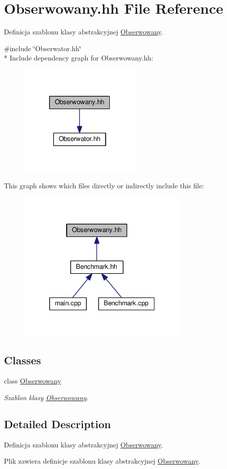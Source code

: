 \hypertarget{a00047}{}\section{Obserwowany.\+hh File Reference}
\label{a00047}


Definicja szablonu klasy abstrakcyjnej \hyperlink{a00015}{Obserwowany}.  


{\ttfamily \#include \char`\"{}Obserwator.\+hh\char`\"{}}\\*
Include dependency graph for Obserwowany.\+hh\+:
\nopagebreak
\begin{figure}[H]
\begin{center}
\leavevmode
\includegraphics[width=172pt]{a00095}
\end{center}
\end{figure}
This graph shows which files directly or indirectly include this file\+:
\nopagebreak
\begin{figure}[H]
\begin{center}
\leavevmode
\includegraphics[width=239pt]{a00096}
\end{center}
\end{figure}
\subsection*{Classes}
\begin{DoxyCompactItemize}
\item 
class \hyperlink{a00015}{Obserwowany}
\begin{DoxyCompactList}\small\item\em Szablon klasy \hyperlink{a00015}{Obserwowany}. \end{DoxyCompactList}\end{DoxyCompactItemize}


\subsection{Detailed Description}
Definicja szablonu klasy abstrakcyjnej \hyperlink{a00015}{Obserwowany}. 

Plik zawiera definicje szablonu klasy abstrakcyjnej \hyperlink{a00015}{Obserwowany}. 